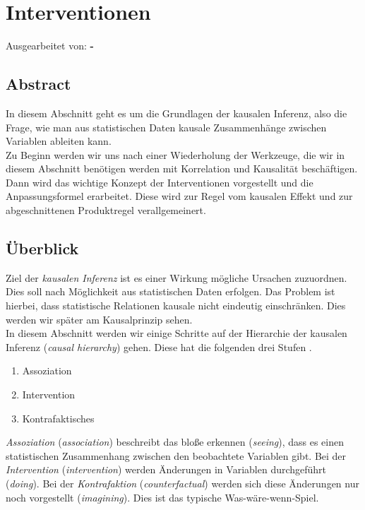 \documentclass[headsepline,11pt,bibliography=leveldown]{scrbook}
\newcommand{\en}[1]{{\scriptsize(\textit{#1})}}
\begin{document}
\setcounter{chapter}{3}
\chapter{Interventionen}
Ausgearbeitet von: {\sffamily\bfseries -}\\

\setcounter{section}{-1}
\section{Abstract}
In diesem Abschnitt geht es um die Grundlagen der kausalen Inferenz, also die Frage, wie man aus statistischen Daten kausale Zusammenhänge zwischen Variablen ableiten kann.\\

Zu Beginn werden wir uns nach einer Wiederholung der Werkzeuge, die wir in diesem Abschnitt benötigen werden mit Korrelation und Kausalität beschäftigen. Dann wird das wichtige Konzept der Interventionen vorgestellt und die Anpassungsformel erarbeitet. Diese wird zur Regel vom kausalen Effekt und zur abgeschnittenen Produktregel verallgemeinert.\\

\section{Überblick}
Ziel der \textit{kausalen Inferenz} ist es einer Wirkung mögliche Ursachen zuzuordnen. Dies soll nach Möglichkeit aus statistischen Daten erfolgen. Das Problem ist hierbei, dass statistische Relationen kausale nicht eindeutig einschränken. Dies werden wir später am Kausalprinzip sehen.\\

In diesem Abschnitt werden wir einige Schritte auf der Hierarchie der kausalen Inferenz \en{causal hierarchy} gehen. Diese hat die folgenden drei Stufen \cite[S. 1]{Paper}.
\begin{enumerate}[label=(\roman*)]
\item Assoziation
\item Intervention
\item Kontrafaktisches
\end{enumerate}
\textit{Assoziation} \en{association} beschreibt das bloße erkennen \en{seeing}, dass es einen statistischen Zusammenhang zwischen den beobachtete Variablen gibt. Bei der \textit{Intervention} \en{intervention} werden Änderungen in Variablen durchgeführt \en{doing}. Bei der \textit{Kontrafaktion} \en{counterfactual} werden sich diese Änderungen nur noch vorgestellt \en{imagining}. Dies ist das typische \glqq Was-wäre-wenn\grqq{}-Spiel.
\end{document}
